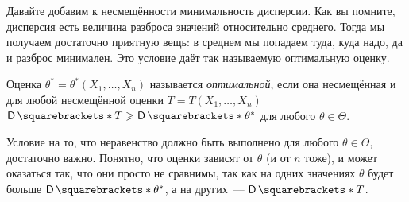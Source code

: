 Давайте добавим к несмещённости минимальность дисперсии. Как вы помните, 
дисперсия есть величина разброса значений относительно среднего. Тогда мы 
получаем достаточно приятную вещь: в среднем мы попадаем туда, куда надо, да и 
разброс минимален. Это условие даёт так называемую оптимальную оценку.
\begin{definition}
	Оценка \(\theta^{*} = \theta^{*}(X_{1}, \dots, X_{n})\) называется 
	\emph{оптимальной}, если она несмещённая и для любой несмещённой оценки \(T 
	= T(X_{1}, \dots, X_{n})\) \(\D{T} \geq \D{\theta^{*}}\) для любого 
	\(\theta \in \Theta\).
\end{definition}

Условие на то, что неравенство должно быть выполнено для любого \(\theta \in 
\Theta\), достаточно важно. Понятно, что оценки зависят от \(\theta\) (и от 
\(n\) тоже), и может оказаться так, что они просто не сравнимы, так как на 
одних значениях \(\theta\) будет больше \(\D{\theta^{*}}\), а на других~--- 
\(\D{T}\).

